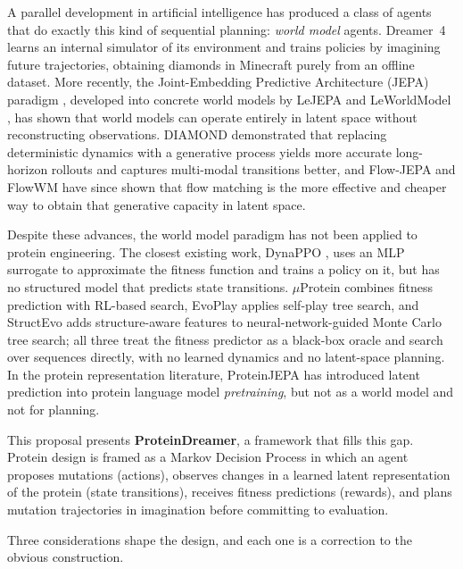 \documentclass[12pt, a4paper]{article}
\begin{document}
A parallel development in artificial intelligence has produced a class of agents that do exactly this kind of sequential planning: \textit{world model} agents. Dreamer~4 \citep{hafner2025dreamer4} learns an internal simulator of its environment and trains policies by imagining future trajectories, obtaining diamonds in Minecraft purely from an offline dataset. More recently, the Joint-Embedding Predictive Architecture (JEPA) paradigm \citep{lecun2022path}, developed into concrete world models by LeJEPA and LeWorldModel \citep{maes2026leworldmodel}, has shown that world models can operate entirely in latent space without reconstructing observations. DIAMOND \citep{alonso2024diamond} demonstrated that replacing deterministic dynamics with a generative process yields more accurate long-horizon rollouts and captures multi-modal transitions better, and Flow-JEPA \citep{huo2026flowjepa} and FlowWM \citep{porcher2026flowwm} have since shown that flow matching is the more effective and cheaper way to obtain that generative capacity in latent space.

Despite these advances, the world model paradigm has not been applied to protein engineering. The closest existing work, DynaPPO \citep{angermueller2020dynappo}, uses an MLP surrogate to approximate the fitness function and trains a policy on it, but has no structured model that predicts state transitions. $\mu$Protein \citep{sun2025muprotein} combines fitness prediction with RL-based search, EvoPlay \citep{wang2023evoplay} applies self-play tree search, and StructEvo \citep{nie2026structevo} adds structure-aware features to neural-network-guided Monte Carlo tree search; all three treat the fitness predictor as a black-box oracle and search over sequences directly, with no learned dynamics and no latent-space planning. In the protein representation literature, ProteinJEPA \citep{ofer2026proteinjepa} has introduced latent prediction into protein language model \textit{pretraining}, but not as a world model and not for planning.

This proposal presents \textbf{ProteinDreamer}, a framework that fills this gap. Protein design is framed as a Markov Decision Process in which an agent proposes mutations (actions), observes changes in a learned latent representation of the protein (state transitions), receives fitness predictions (rewards), and plans mutation trajectories in imagination before committing to evaluation.

Three considerations shape the design, and each one is a correction to the obvious construction.
\end{document}
